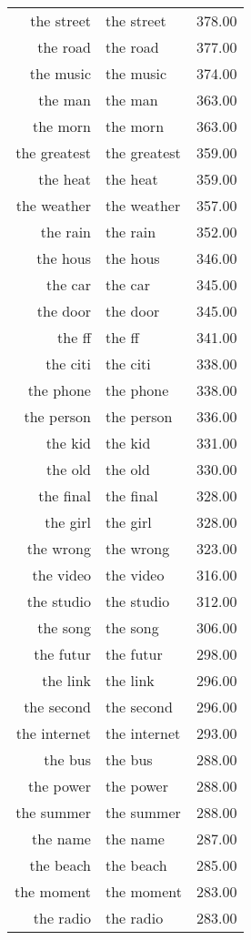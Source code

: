 \begin{table}[ht]
\begin{tabular}{rlr}
  the street & the street & 378.00 \\ 
  the road & the road & 377.00 \\ 
  the music & the music & 374.00 \\ 
  the man & the man & 363.00 \\ 
  the morn & the morn & 363.00 \\ 
  the greatest & the greatest & 359.00 \\ 
  the heat & the heat & 359.00 \\ 
  the weather & the weather & 357.00 \\ 
  the rain & the rain & 352.00 \\ 
  the hous & the hous & 346.00 \\ 
  the car & the car & 345.00 \\ 
  the door & the door & 345.00 \\ 
  the ff & the ff & 341.00 \\ 
  the citi & the citi & 338.00 \\ 
  the phone & the phone & 338.00 \\ 
  the person & the person & 336.00 \\ 
  the kid & the kid & 331.00 \\ 
  the old & the old & 330.00 \\ 
  the final & the final & 328.00 \\ 
  the girl & the girl & 328.00 \\ 
  the wrong & the wrong & 323.00 \\ 
  the video & the video & 316.00 \\ 
  the studio & the studio & 312.00 \\ 
  the song & the song & 306.00 \\ 
  the futur & the futur & 298.00 \\ 
  the link & the link & 296.00 \\ 
  the second & the second & 296.00 \\ 
  the internet & the internet & 293.00 \\ 
  the bus & the bus & 288.00 \\ 
  the power & the power & 288.00 \\ 
  the summer & the summer & 288.00 \\ 
  the name & the name & 287.00 \\ 
  the beach & the beach & 285.00 \\ 
  the moment & the moment & 283.00 \\ 
  the radio & the radio & 283.00 \\ 

\end{tabular}
\end{table}

